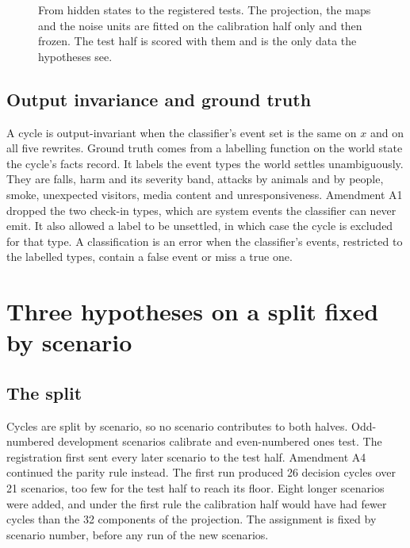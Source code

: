 \begin{figure}[t]
  \centering
  
  \caption{From hidden states to the registered tests. The projection, the maps and the noise
  units are fitted on the calibration half only and then frozen. The test half is scored with
  them and is the only data the hypotheses see.}
  \label{fig:ieip-scoring}
\end{figure}

\subsection{Output invariance and ground truth}

A cycle is output-invariant when the classifier's event set is the same on $x$ and on all five
rewrites.
Ground truth comes from a labelling function on the world state the cycle's facts record.
It labels the event types the world settles unambiguously.
They are falls, harm and its severity band, attacks by animals and by people, smoke, unexpected
visitors, media content and unresponsiveness.
Amendment A1 dropped the two check-in types, which are system events the classifier can never
emit.
It also allowed a label to be unsettled, in which case the cycle is excluded for that type.
A classification is an error when the classifier's events, restricted to the labelled types,
contain a false event or miss a true one.

\section{Three hypotheses on a split fixed by scenario}

\subsection{The split}

Cycles are split by scenario, so no scenario contributes to both halves.
Odd-numbered development scenarios calibrate and even-numbered ones test.
The registration first sent every later scenario to the test half.
Amendment A4 continued the parity rule instead.
The first run produced 26 decision cycles over 21 scenarios, too few for the test half to reach
its floor.
Eight longer scenarios were added, and under the first rule the calibration half would have had
fewer cycles than the 32 components of the projection.
The assignment is fixed by scenario number, before any run of the new scenarios.

